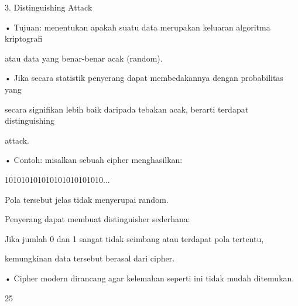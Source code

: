 \documentclass{article}
\begin{document}

3. Distinguishing Attack

• Tujuan: menentukan apakah suatu data merupakan keluaran algoritma kriptografi 

atau data yang benar-benar acak (random).

• Jika secara statistik penyerang dapat membedakannya dengan probabilitas yang 

secara signifikan lebih baik daripada tebakan acak, berarti terdapat distinguishing 

attack.

• Contoh: misalkan sebuah cipher menghasilkan:

               101010101010101010101010...

    Pola tersebut jelas tidak menyerupai random. 

    Penyerang dapat membuat distinguisher sederhana: 

    Jika jumlah 0 dan 1 sangat tidak seimbang atau terdapat pola tertentu, 

kemungkinan data tersebut berasal dari cipher.

• Cipher modern dirancang agar kelemahan seperti ini tidak mudah ditemukan.

25
\end{document}

